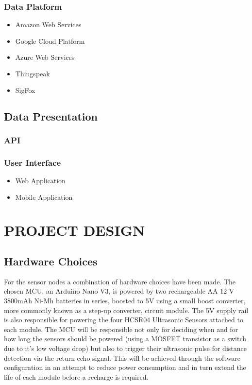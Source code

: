 \documentclass[10pt,twocolumn]{witseiepaper}
\begin{document}
		\subsubsection{Data Platform}
			\begin{itemize}
				\item Amazon Web Services
				\item Google Cloud Platform
				\item Azure Web Services
				\item Thingspeak
				\item SigFox
			\end{itemize}
	
	\subsection{Data Presentation}
		\subsubsection{API}
		\subsubsection{User Interface}
			\begin{itemize}
				\item Web Application
				\item Mobile Application
			\end{itemize}

\section{PROJECT DESIGN}
	\subsection{Hardware Choices}
	
		For the sensor nodes a combination of hardware choices have been made. The chosen MCU, an Arduino Nano V3, is powered by two rechargeable AA 12 V 3800mAh Ni-Mh batteries in series, boosted to 5V using a small boost converter, more commonly known as a step-up converter, circuit module. The 5V supply rail is also responsible for powering the four HCSR04 Ultrasonic Sensors attached to each module. The MCU will be responsible not only for deciding when and for how long the sensors should be powered (using a MOSFET transistor as a switch due to it's low voltage drop) but also to trigger their ultrasonic pulse for distance detection via the return echo signal. This will be achieved through the software configuration in an attempt to reduce power consumption and in turn extend the life of each module before a recharge is required. 
		
\end{document}
